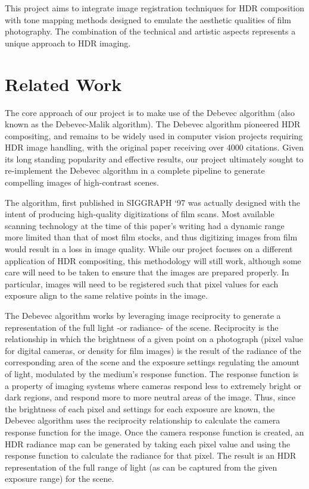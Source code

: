 \documentclass[
	a4paper, %
	10pt, %
	unnumberedsections, %
	twoside, %
]{LTJournalArticle}
\begin{document}
This project aims to integrate image registration techniques for HDR composition with tone mapping methods designed to emulate the aesthetic qualities of film photography. The combination of the technical and artistic aspects represents a unique approach to HDR imaging. 


\section{Related Work}

The core approach of our project is to make use of the Debevec algorithm \autocite{debevec} (also known as the Debevec-Malik algorithm). The Debevec algorithm pioneered HDR compositing, and remains to be widely used in computer vision projects requiring HDR image handling, with the original paper receiving over 4000 citations. Given its long standing popularity and effective results, our project ultimately sought to re-implement the Debevec algorithm in a complete pipeline to generate compelling images of high-contrast scenes. 

The algorithm, first published in SIGGRAPH ‘97 was actually designed with the intent of producing high-quality digitizations of film scans. Most available scanning technology at the time of this paper’s writing had a dynamic range more limited than that of most film stocks, and thus digitizing images from film would result in a loss in image quality. While our project focuses on a different application of HDR compositing, this methodology will still work, although some care will need to be taken to ensure that the images are prepared properly. In particular, images will need to be registered such that pixel values for each exposure align to the same relative points in the image.

The Debevec algorithm works by leveraging image reciprocity to generate a representation of the full light -or radiance- of the scene. Reciprocity is the relationship in which the brightness of a given point on a photograph (pixel value for digital cameras, or density for film images) is the result of the radiance of the corresponding area of the scene and the exposure settings regulating the amount of light, modulated by the medium’s response function. The response function is a property of imaging systems where cameras respond less to extremely bright or dark regions, and respond more to more neutral areas of the image. Thus, since the brightness of each pixel and settings for each exposure are known, the Debevec algorithm uses the reciprocity relationship to calculate the camera response function for the image. Once the camera response function is created, an HDR radiance map can be generated by taking each pixel value and using the response function to calculate the radiance for that pixel. The result is an HDR representation of the full range of light (as can be captured from the given exposure range) for the scene.
\end{document}
